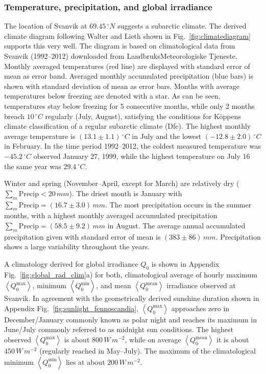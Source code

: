 \documentclass[bg, manuscript]{copernicus}
\begin{document}
\subsubsection{Temperature, precipitation, and global irradiance}
\label{subsubsec:clim_temp_prec}
The location of Svanvik at $69.45\,\unit{^\circ N}$ suggests a subarctic climate. The derived climate diagram following Walter and Lieth shown in Fig.~\ref{fig:climatediagram} supports this very well. The diagram is based on climatological data from Svanvik (1992--2012) downloaded from LandbruksMeteorologiske Tjeneste. Monthly averaged temperatures (red line) are displayed with standard error of mean as error band. Averaged monthly accumulated precipitation (blue bars) is shown with standard deviation of mean as error bars. Months with average temperatures below freezing are denoted with a star. As can be seen, temperatures stay below freezing for 5 consecutive months, while only 2 months breach $10\,\unit{^\circ C}$ regularly (July, August), satisfying the conditions for K\"{o}ppens climate classification of a regular subarctic climate (Dfc). The highest monthly average temperature is $(13.1\pm 1.1)\,\unit{^\circ C}$ in July and the lowest $(-12.8\pm 2.0)\,\unit{^\circ C}$ in February. In the time period 1992--2012, the coldest measured temperature was $-45.2\,\unit{^\circ C}$ observed January 27, 1999, while the highest temperature on July 16 the same year was $29.4\,\unit{^\circ C}$.

Winter and spring (November--April, except for March) are relatively dry ($\sum_m \mathrm{Precip} < 20\,\unit{mm}$). The driest month is January with $\sum_m \mathrm{Precip} = (16.7\pm 3.0)\,\unit{mm}$. The most precipitation occurs in the summer months, with a highest monthly averaged accumulated precipitation $\sum_m \mathrm{Precip} = (58.5\pm 9.2)\,\unit{mm}$ in August. The average annual accumulated precipitation given with standard error of mean is $(383\pm 86)\,\unit{mm}$. Precipitation shows a large variability throughout the years.

A climatology derived for global irradiance $Q_0$ is shown in Appendix Fig.~\ref{fig:global_rad_clim}a) for both, climatological average of hourly maximum $\left<Q_0^\mathrm{max}\right>$, minimum $\left<Q_0^\mathrm{min}\right>$, and mean $\left<Q_0^\mathrm{mean}\right>$ irradiance observed at Svanvik. In agreement with the geometrically derived sunshine duration shown in Appendix Fig.~\ref{fig:sunlight_fennoscandia}, $\left<Q_0^\mathrm{max}\right>$ approaches zero in December/January commonly known as polar night and reaches its maximum in June/July commonly referred to as midnight sun conditions. The highest observed $\left<Q_0^\mathrm{max}\right>$ is about $800\,\unit{W\,m^{-2}}$, while on average $\left<Q_0^\mathrm{mean}\right>$ it is about $450\,\unit{W\,m^{-2}}$ (regularly reached in May--July). The maximum of the climatological minimum $\left<Q_0^\mathrm{min}\right>$ lies at about $200\,\unit{W\,m^{-2}}$.
\end{document}
